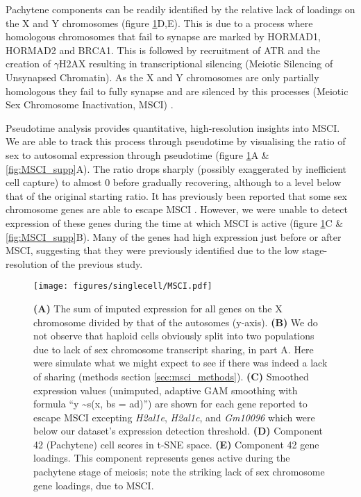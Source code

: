 Pachytene components can be readily identified by the relative lack of loadings on the X and Y chromosomes (figure \ref{fig:MSCI}D,E). This is due to a process where homologous chromosomes that fail to synapse are marked by HORMAD1, HORMAD2 and BRCA1. This is followed by recruitment of ATR and the creation of $\gamma$H2AX resulting in transcriptional silencing (Meiotic Silencing of Unsynapsed Chromatin). As the X and Y chromosomes are only partially homologous they fail to fully synapse and are silenced by this processes (Meiotic Sex Chromosome Inactivation, MSCI) \parencite{Turner2007Meiotic, Turner2015Meiotic}.

Pseudotime analysis provides quantitative, high-resolution insights into MSCI. We are able to track this process through pseudotime by visualising the ratio of sex to autosomal expression through pseudotime (figure \ref{fig:MSCI}A \& \ref{fig:MSCI_supp}A). The ratio drops sharply (possibly exaggerated by inefficient cell capture) to almost 0 before gradually recovering, although to a level below that of the original starting ratio. It has previously been reported that some sex chromosome genes are able to escape MSCI \parencite{daCruz2016Transcriptome, Soumillon2013Cellular}. However, we were unable to detect expression of these genes during the time at which MSCI is active (figure \ref{fig:MSCI}C \& \ref{fig:MSCI_supp}B). Many of the genes had high expression just before or after MSCI, suggesting that they were previously identified due to the low stage-resolution of the previous study. 

\begin{figure}[H]
	\centering
	\texttt{[image: figures/singlecell/MSCI.pdf]}
	\caption[Meiotic Sex Chromosome Inactivation]{
		\textbf{(A)} The sum of imputed expression for all genes on the X chromosome divided by that of the autosomes (y-axis).
		\textbf{(B)} We do not observe that haploid cells obviously split into two populations due to lack of sex chromosome transcript sharing, in part A. Here were simulate what we might expect to see if there was indeed a lack of sharing (methods section \ref{sec:msci_methods}).
		\textbf{(C)} Smoothed expression values (unimputed, adaptive GAM smoothing with formula ``y \textasciitilde s(x, bs = ad)'') are shown for each gene reported to escape MSCI \parencite{daCruz2016Transcriptome} excepting \textit{H2al1e}, \textit{H2al1c}, and \textit{Gm10096} which were below our dataset's expression detection threshold.
		\textbf{(D)} Component 42 (Pachytene) cell scores in t-SNE space.
		\textbf{(E)} Component 42 gene loadings. This component represents genes active during the pachytene stage of meiosis; note the striking lack of sex chromosome gene loadings, due to MSCI.
	}
	\label{fig:MSCI}
\end{figure}

